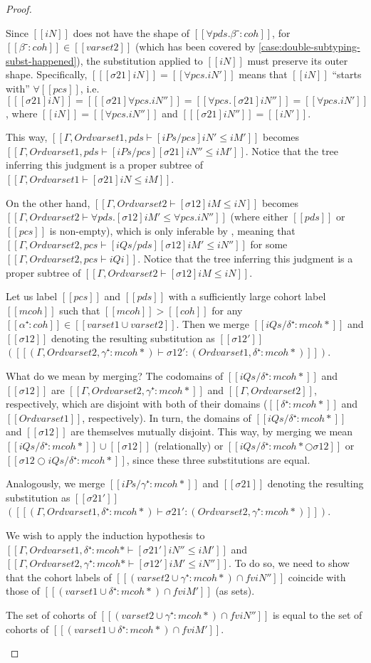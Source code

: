 \begin{proof}
\begin{caseof}
    Since $[[iN]]$ does not have the shape of $[[∀pds.β⁻:coh]]$, for $[[β⁻:coh]]
    \in [[varset2]]$ (which has been covered by
    \cref{case:double-subtyping-subst-happened}), the substitution applied to
    $[[iN]]$ must preserve its outer shape. Specifically,
    $[[ [σ21]iN ]] = [[∀pcs.iN']]$
    means that $[[ iN ]]$ ``starts with'' $\forall[[pcs]]$, i.e.
    $[[ [σ21]iN ]] = [[ [σ21]∀pcs.iN'' ]] = [[ ∀pcs.[σ21]iN'' ]] = [[ ∀pcs.iN'
    ]]$, where $[[iN]] = [[∀pcs.iN'']]$ and $[[ [σ21]iN'']] = [[iN']]$.

    This way, $[[Γ, Ord varset1, pds ⊢ [iPs/pcs]iN' ≤ iM']]$ becomes
    $[[Γ, Ord varset1, pds ⊢ [iPs/pcs][σ21]iN'' ≤ iM']]$.
    Notice that the tree inferring this judgment is a proper subtree of
    $[[Γ, Ord varset1 ⊢ [σ21]iN ≤ iM]]$.


    On the other hand, $[[Γ, Ord varset2 ⊢ [σ12]iM ≤ iN]]$
    becomes $[[Γ, Ord varset2 ⊢ ∀pds.[σ12]iM' ≤ ∀pcs.iN'']]$
    (where either $[[pds]]$ or $[[pcs]]$ is non-empty),
    which is only inferable by ,
    meaning that
    $[[Γ, Ord varset2, pcs ⊢ [iQs/pds][σ12]iM' ≤ iN'']]$ for some
    $[[Γ, Ord varset2, pcs ⊢ iQi]]$.
    Notice that the tree inferring this judgment is a proper subtree of
    $[[Γ, Ord varset2 ⊢ [σ12]iM ≤ iN]]$.

    Let us label $[[pcs]]$ and $[[pds]]$ with a sufficiently large cohort label
    $[[mcoh]]$ such that $[[mcoh]] > [[coh]]$ for any $[[α⁺:coh]] \in [[varset1 ∪
    varset2]]$. Then we merge $[[iQs/δ⁺:mcoh*]]$ and $[[σ12]]$ denoting the resulting
    substitution as $[[σ12']]$ $([[(Γ, Ord varset2, γ⁺:mcoh*) ⊢ σ12' : (Ord varset1, δ⁺:mcoh*)]])$.

    What do we mean by merging? The codomains of $[[iQs/δ⁺:mcoh*]]$ and
    $[[σ12]]$ are $[[Γ, Ord varset2,  γ⁺:mcoh*]]$ and $[[Γ, Ord varset2]]$,
    respectively, which are disjoint with both of their domains
    ($[[δ⁺:mcoh*]]$ and $[[Ord varset1]]$, respectively). In turn, the domains
    of $[[iQs/δ⁺:mcoh*]]$ and $[[σ12]]$ are themselves mutually disjoint.
    This way, by merging we mean
    $[[iQs/δ⁺:mcoh*]] \cup [[σ12]]$ (relationally) or
    $[[iQs/δ⁺:mcoh* ○ σ12]]$ or
    $[[σ12 ○ iQs/δ⁺:mcoh*]]$, since these three substitutions are equal.

    Analogously, we merge $[[iPs/γ⁺:mcoh*]]$ and $[[σ21]]$ denoting the
    resulting substitution as $[[σ21']]$ $([[(Γ, Ord varset1, δ⁺:mcoh*) ⊢ σ21' :
    (Ord varset2, γ⁺:mcoh*)]])$.

    We wish to apply the induction hypothesis to
    $[[Γ, Ord varset1, δ⁺:mcoh* ⊢ [σ21']iN'' ≤ iM']]$ and
    $[[Γ, Ord varset2, γ⁺:mcoh* ⊢ [σ12']iM' ≤ iN'']]$.
    To do so, we need to show that the cohort labels of $[[(varset2 ∪ {γ⁺:mcoh*}) ∩ fv
    iN'']]$ coincide with those of $[[(varset1 ∪ {δ⁺:mcoh*}) ∩ fv iM']]$ (as sets).
    \begin{assertion*}
      The set of cohorts of $[[(varset2 ∪ {γ⁺:mcoh*}) ∩ fv iN'']]$
      is equal to the set of cohorts of $[[(varset1 ∪ {δ⁺:mcoh*}) ∩ fv iM']]$.
    \end{assertion*}


\end{caseof}
\end{proof}
